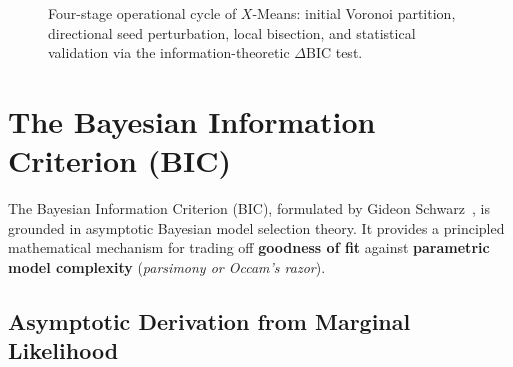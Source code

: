 \begin{figure}[htbp]
\caption{Four-stage operational cycle of $X$-Means: initial Voronoi partition, directional seed perturbation, local bisection, and statistical validation via the information-theoretic $\Delta\mathrm{BIC}$ test.}
\label{fig:dm-xmeans-cycle}
\end{figure}

\section{The Bayesian Information Criterion (BIC)}
\label{sec:dm-bic-theory}

The Bayesian Information Criterion (BIC), formulated by Gideon Schwarz~\cite{schwarz1978}, is grounded in asymptotic Bayesian model selection theory. It provides a principled mathematical mechanism for trading off \textbf{goodness of fit} against \textbf{parametric model complexity} (\textit{parsimony or Occam's razor}).

\subsection{Asymptotic Derivation from Marginal Likelihood}

